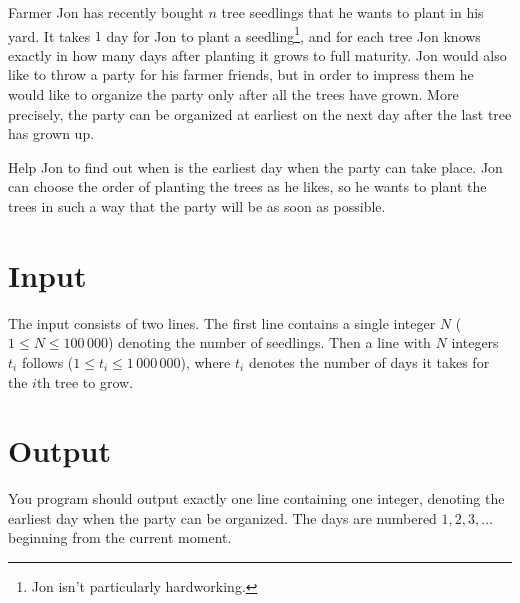 

Farmer Jon has recently bought $n$ tree seedlings that he wants to plant in his yard. It takes $1$ day for Jon to plant a seedling\footnote{Jon isn't particularly hardworking.}, and for each tree Jon knows exactly in how many days after planting it grows to full maturity. Jon would also like to throw a party for his farmer friends, but in order to impress them he would like to organize the party only after all the trees have grown. More precisely, the party can be organized at earliest on the next day after the last tree has grown up.

Help Jon to find out when is the earliest day when the party can take place. Jon can choose the
order of planting the trees as he likes, so he wants to plant the trees in such a way that the party
will be as soon as possible.

\section*{Input}

The input consists of two lines. The first line contains a single integer $N$ ($1\leq N \leq 100\, 000$) denoting the number of seedlings. Then a line with $N$ integers $t_i$ follows ($1\leq t_i\leq 1\, 000\, 000$), where $t_i$ denotes the number of days it takes for the $i$th tree to grow.

\section*{Output}

You program should output exactly one line containing one integer, denoting the earliest day when the party can be organized. The days are numbered $1,2,3,\ldots$ beginning from the current moment.


